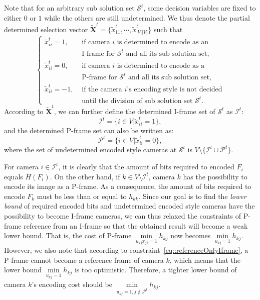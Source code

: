 Note that for an arbitrary sub solution set $\mathcal{S}^t$, some decision variables are fixed to either $0$ or $1$ while the others are still undetermined.
We thus denote the partial determined selection vector ${\tilde{\mathbf{X}}^t = \{ \tilde{x}_{11}^t,\cdots, \tilde{x}_{|V||V|}^t \} }$ such that
\begin{equation*}
\left\{ \begin{array}{ll}
\tilde{x}_{ii}^t = 1,  &\text{ if camera $i$ is determined to encode as an} \\
                   	   &\text{ I-frame for $\mathcal{S}^t$ and all its sub solution set,} \\
\tilde{x}_{ii}^t = 0,  &\text{ if camera $i$ is determined to encode as a} \\
                   	   &\text{ P-frame for $\mathcal{S}^t$ and all its sub solution set,} \\
\tilde{x}_{ii}^t = -1, &\text{ if the camera $i$'s encoding style is not decided} \\
                       &\text{ until the division of sub solution set $\mathcal{S}^t$.}
\end{array} \right.
\end{equation*}
%
According to $\tilde{\mathbf{X}}^t$, we can further define the determined I-frame set of $\mathcal{S}^t$ as $\mathcal{I}^t$:
\begin{equation}
\mathcal{I}^t = \{ i \in V | \tilde{x}_{ii}^t = 1 \},
\label{eq::IframeSet}
\end{equation}
and the determined P-frame set can also be written as:
\begin{equation}
\mathcal{P}^t = \{ i \in V | \tilde{x}_{ii}^t = 0 \},
\label{eq::PframeSet}
\end{equation}
where the set of undetermined encoded style cameras at $\mathcal{S}^t$ is $V \setminus \{ \mathcal{I}^t \cup \mathcal{P}^t \}$.

For camera $i \in \mathcal{I}^t$, it is clearly that the amount of bits required to encoded $F_i$ equals $H(F_i)$.
On the other hand, if $k \in V \setminus \mathcal{I}^t$, camera $k$ has the possibility to encode its image as a P-frame.
As a consequence, the amount of bits required to encode $F_k$ must be less than or equal to $h_{kk}$.
Since our goal is to find the \emph{lower bound} of required encoded bits and undetermined encoded style cameras have the possibility to become I-frame cameras, we can thus relaxed the constraints of P-frame reference from an I-frame so that the obtained result will become a weak lower bound.
That is, the cost of P-frame $\underset{u_{kj}x_{jj}=1}{\min} h_{kj}$ now becomes $\underset{u_{kj}=1}{\min} h_{kj}$.
However, we also note that according to constraint~\eqref{eq::referenceOnlyIframe}, a P-frame cannot become a reference frame of camera $k$, which means that the lower bound $\underset{u_{kj}=1}{\min} h_{kj}$ is too optimistic.
Therefore, a tighter lower bound of camera $k$'s encoding cost should be $\underset{u_{kj}=1, j \notin \mathcal{P}^t}{\min} h_{kj}$.
%


